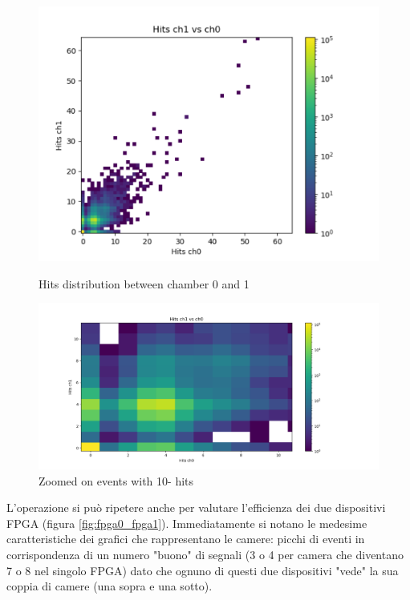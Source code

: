 \documentclass[a4paper,11pt]{book}
\begin{document}
\begin{figure}[hbtp]
\begin{minipage}[c]{0.5\textwidth}
\centering
\includegraphics[scale=0.5]{pictures/Hits_ch1_vs_ch0.pdf}
\caption{Hits distribution between chamber 0 and 1}
\label{fig:ch1_ch0}
\end{minipage}  
\begin{minipage}[c]{0.5\textwidth}
\centering
\includegraphics[scale=0.3]{pictures/Hits_ch1_vs_ch0_zoom.pdf}
\caption{Zoomed on events with 10- hits}
\label{fig:ch1_ch0_zoom}
\end{minipage}
\end{figure}

L'operazione si può ripetere anche per valutare l'efficienza dei due dispositivi FPGA (figura \ref{fig:fpga0_fpga1}). Immediatamente si notano le medesime caratteristiche dei grafici che rappresentano le camere: picchi di eventi in corrispondenza di un numero "buono" di segnali (3 o 4 per camera che diventano 7 o 8 nel singolo FPGA) dato che ognuno di questi due dispositivi "vede" la sua coppia di camere (una sopra e una sotto).
\end{document}
